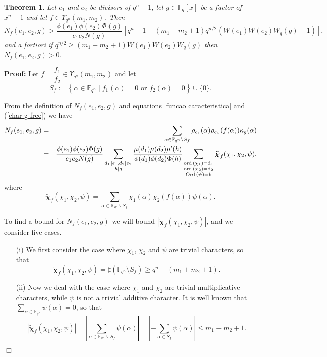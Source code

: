 \documentclass[12pt]{article}
\newtheorem{theorem}{Theorem}[section]
\newenvironment{proof}{\noindent \textbf{Proof: }}{\hfill
$\Box$  \vspace{1ex}}
\newcommand{\F}{\mathbb{F}}
\def\bchi{\boldsymbol{\chi}}
\def \ord {\rm{ord}\,}
\def \Ord {\rm{Ord}\,}
\begin{document}
\begin{theorem}\label{principal}
	Let  $e_1$ and $e_2$ be divisors of   $q^n-1$, let 
	 $g \in \F_q[x]$ be a factor of $x^n -1$ and let $f \in \Upsilon_{q^n} 
	 (m_1,m_2)$. Then
	$$
	N_{f}(e_1,e_2,g) > \frac{\phi(e_1)\phi(e_2) \Phi(g)}{e_1 e_2 N(g)}
	\left[
	q^n -1 - (m_1+m_2+1) q^{n/2} \left(W(e_1)W(e_2)W_q(g) - 1 \right)
	\right] ,
	$$
	and a fortiori  
	if $q^{n/2} \geq (m_1 + m_2 + 1) W(e_1)W(e_2)W_q(g)$ then 
	$N_{f}(e_1,e_2,g)>0$.
\end{theorem}
\begin{proof}
Let $f = \dfrac{f_1}{f_2} \in \Upsilon_{q^n}(m_1,m_2)$
and let
$$
S_{f}:=
\left\{ \alpha \in \F_{q^n} \mid f_1(\alpha)=0 \text{ or } f_2(\alpha)=0  \right\} \cup \{ 0 \}.
$$

From the definition of $N_{f}(e_1,e_2,g)$ and equations \eqref{funcao 
caracteristica} and (\ref{char-g-free})	 we have
\begin{eqnarray*}
N_{f}(e_1,e_2,g) & = &
\sum_{\alpha \in \F_{q^n} \backslash S_{f}}
\rho_{e_1}(\alpha) \rho_{e_2} (f(\alpha)) \kappa_g(\alpha) \nonumber \\
& = &
\frac{\phi(e_1)\phi(e_2) \Phi(g)}{e_1 e_2 N(g)}
\sum_{\substack{d_1\mid e_1 , d_2\mid e_2 \\ h\mid g}}
\frac{\mu(d_1)\mu(d_2) \mu'(h)}{\phi(d_1)\phi(d_2) \Phi(h)}
\sum_{\substack{\ord(\chi_1)=d_1 \\ \ord(\chi_2)=d_2 \\ \Ord(\psi)=h}}
\tilde{\bchi}_f (\chi_1,\chi_2,\psi), %
\end{eqnarray*}
where
$$
\tilde{\bchi}_f (\chi_1,\chi_2,\psi)
=
\sum_{\alpha \in \F_{q^n} \backslash S_{f}}
\chi_1(\alpha) \chi_2(f(\alpha)) \psi(\alpha) .
$$



To find a bound for $N_f(e_1,e_2,g)$ we will
bound $| \tilde{\bchi}_f(\chi_{1},\chi_{2},\psi) |$,
and we consider five cases.
\begin{enumerate}
\item[(i)] We first consider the case where $\chi_1$, $\chi_2$ and
$\psi$ are trivial characters, so that
$$
\tilde{\bchi}_f(\chi_{1},\chi_{2},\psi) = \sharp (\mathbb{F}_{q^n} \setminus S_f) \geq
q^n - (m_1+m_2+1).
$$

\item[(ii)] Now we deal with the case where $\chi_1$ and $\chi_2$ are trivial 
multiplicative  characters, while $\psi$ is not a trivial additive character. 
It is well known that 
$\displaystyle \sum_{\alpha \in \mathbb{F}_{q^n}}\psi(\alpha)= 0$, so that
$$
|\tilde{\bchi}_f(\chi_{1},\chi_{2},\psi) | =
\left| \sum_{\alpha\in\F_{q^n}\backslash S_f} \psi (\alpha)
\right| =
\left| - \sum_{\alpha\in S_f} \psi (\alpha)
\right| \leq m_1 + m_2+1.
$$


\end{enumerate}
\end{proof}
\end{document}
